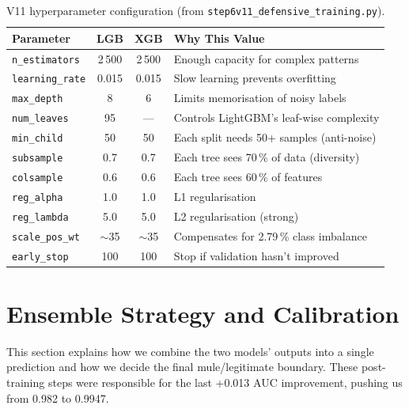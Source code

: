 \documentclass[11pt, a4paper]{article}
\begin{document}
\begin{table}[H]
\centering\small
\caption{V11 hyperparameter configuration (from \texttt{step6v11\_defensive\_training.py}).}
\begin{tabular}{@{}lcc p{4.8cm}@{}}
\toprule
\textbf{Parameter} & \textbf{LGB} & \textbf{XGB} & \textbf{Why This Value} \\
\midrule
\texttt{n\_estimators}   & 2\,500 & 2\,500 & Enough capacity for complex patterns \\
\texttt{learning\_rate}  & 0.015 & 0.015 & Slow learning prevents overfitting \\
\texttt{max\_depth}      & 8     & 6     & Limits memorisation of noisy labels \\
\texttt{num\_leaves}     & 95    & ---   & Controls LightGBM's leaf-wise complexity \\
\texttt{min\_child}      & 50    & 50    & Each split needs 50+ samples (anti-noise) \\
\texttt{subsample}       & 0.7   & 0.7   & Each tree sees 70\,\% of data (diversity) \\
\texttt{colsample}       & 0.6   & 0.6   & Each tree sees 60\,\% of features \\
\texttt{reg\_alpha}      & 1.0   & 1.0   & L1 regularisation \\
\texttt{reg\_lambda}     & 5.0   & 5.0   & L2 regularisation (strong) \\
\texttt{scale\_pos\_wt}  & $\sim$35 & $\sim$35 & Compensates for 2.79\,\% class imbalance \\
\texttt{early\_stop}     & 100   & 100   & Stop if validation hasn't improved \\
\bottomrule
\end{tabular}
\end{table}


\section{Ensemble Strategy and Calibration}

This section explains how we combine the two models' outputs into a single prediction and
how we decide the final mule/legitimate boundary. These post-training steps were responsible
for the last +0.013 AUC improvement, pushing us from 0.982 to 0.9947.

\end{document}
